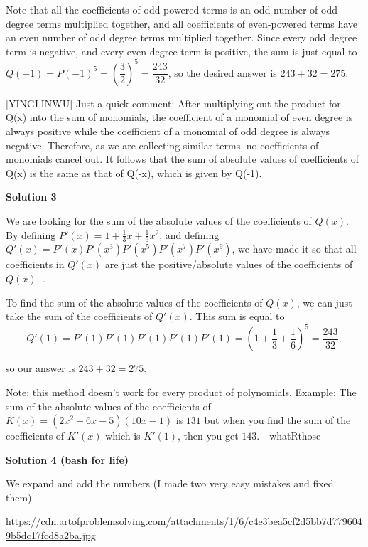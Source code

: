 \begin{enumerate}
Note that all the coefficients of odd-powered terms is an odd number of odd degree terms multiplied together, and all coefficients of even-powered terms have an even number of odd degree terms multiplied together. Since every odd degree term is negative, and every even degree term is positive, the sum is just equal to $Q(-1)=P(-1)^{5}=\left( \dfrac{3}{2}\right)^{5}=\dfrac{243}{32}$, so the desired answer is $243+32=\boxed{275}$.

 [YINGLINWU] Just a quick comment: After multiplying out the product for Q(x) into the sum of monomials, the coefficient of a monomial of even degree is always positive while the coefficient of a monomial of odd degree is always negative. Therefore, as we are collecting similar terms, no coefficients of monomials cancel out. It follows that the sum of absolute values of coefficients of Q(x) is the same as that of Q(-x), which is given by Q(-1).

 



\textbf{Solution 3}

We are looking for the sum of the absolute values of the coefficients of $Q(x)$. By defining $P'(x) = 1 + \frac{1}{3}x+\frac{1}{6}x^2$, and defining $Q'(x) = P'(x)P'(x^3)P'(x^5)P'(x^7)P'(x^9)$, we have made it so that all coefficients in $Q'(x)$ are just the positive/absolute values of the coefficients of $Q(x)$. . 

 
To find the sum of the absolute values of the coefficients of $Q(x)$, we can just take the sum of the coefficients of $Q'(x)$. This sum is equal to
 \[Q'(1) = P'(1)P'(1)P'(1)P'(1)P'(1) = \left(1+\frac{1}{3}+\frac{1}{6}\right)^5 = \frac{243}{32},\]

 so our answer is $243+32 = \boxed{275}$.

 Note: this method doesn't work for every product of polynomials. Example: The sum of the absolute values of the coefficients of $K(x) = (2x^2 - 6x - 5)(10x - 1)$ is $131$ but when you find the sum of the coefficients of $K'(x)$ which is $K'(1)$, then you get $143$. - whatRthose

 


 



\textbf{Solution 4 (bash for life)}

We expand and add the numbers (I made two very easy mistakes and fixed them).

 \href{https://cdn.artofproblemsolving.com/attachments/1/6/c4e3bea5cf2d5bb7d7796049b5dc17fcd8a2ba.jpg}{https://cdn.artofproblemsolving.com/attachments/1/6/c4e3bea5cf2d5bb7d7796049b5dc17fcd8a2ba.jpg}


\end{enumerate}
